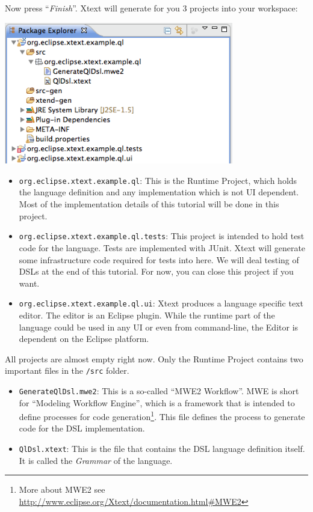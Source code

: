 Now press ``\emph{Finish}''. Xtext will generate for you 3 projects into your workspace:

\includegraphics[width=10cm]{./images/chapter01/WorkspaceAfterWizard.png}

\begin{itemize}
  \item \texttt{org.eclipse.xtext.example.ql}: This is the Runtime Project,
  which holds the language definition and any implementation which is not UI
  dependent. Most of the implementation details of this tutorial will be done in
  this project.
  \item \texttt{org.eclipse.xtext.example.ql.tests}: This project is intended to
  hold test code for the language. Tests are implemented with JUnit. Xtext will
  generate some infrastructure code required for tests into here. We will deal
  testing of DSLs at the end of this tutorial. For now, you can close this
  project if you want.
  \item \texttt{org.eclipse.xtext.example.ql.ui}: Xtext produces a language
  specific text editor. The editor is an Eclipse plugin. While the runtime part
  of the language could be used in any UI or even from command-line, the Editor
  is dependent on the Eclipse platform.
\end{itemize}

All projects are almost empty right now. Only the Runtime Project contains two
important files in the \texttt{/src} folder.
\begin{itemize}
  \item \texttt{GenerateQlDsl.mwe2}: This is a so-called ``MWE2 Workflow''. MWE
  is short for ``Modeling Workflow Engine'', which is a framework that is
  intended to define processes for code generation\footnote{More about MWE2
  see \url{http://www.eclipse.org/Xtext/documentation.html\#MWE2}}. This file
  defines the process to generate code for the DSL implementation.
  \item \texttt{QlDsl.xtext}: This is the file that contains the DSL language
  definition itself. It is called the \emph{Grammar} of the language.
\end{itemize}

